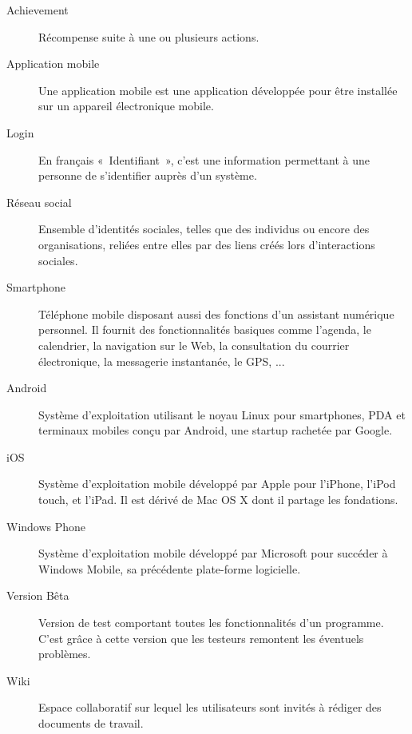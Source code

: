 \documentclass{life-fr}
\begin{document}
\begin{description}
\item[Achievement]
Récompense suite à une ou plusieurs actions.

\item[Application mobile]
Une application mobile est une application développée pour être installée sur un appareil électronique mobile.

\item[Login]
En français «~Identifiant~», c'est une information permettant à une personne de s'identifier auprès d'un système.

\item[Réseau social]
Ensemble d'identités sociales, telles que des individus ou encore des organisations, reliées entre elles par des liens créés lors d’interactions sociales.

\item[Smartphone]
Téléphone mobile disposant aussi des fonctions d'un assistant numérique personnel. Il fournit des fonctionnalités basiques comme l'agenda, le calendrier, la navigation sur le Web, la consultation du courrier électronique, la messagerie instantanée, le GPS, ...

\item[Android]
Système d’exploitation utilisant le noyau Linux pour smartphones, PDA et terminaux mobiles conçu par Android, une startup rachetée par Google.

\item[iOS]
Système d’exploitation mobile développé par Apple pour l'iPhone, l'iPod touch, et l'iPad. Il est dérivé de Mac OS X dont il partage les fondations.

\item[Windows Phone]
Système d’exploitation mobile développé par Microsoft pour succéder à Windows Mobile, sa précédente plate-forme logicielle.

\item[Version Bêta]
Version de test comportant toutes les fonctionnalités d'un programme. C'est grâce à cette version que les testeurs remontent les éventuels problèmes.

\item[Wiki]
Espace collaboratif sur lequel les utilisateurs sont invités à rédiger des documents de travail.


\end{description}


\end{document}
